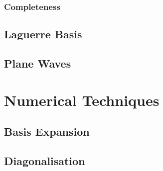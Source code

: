 \documentclass[draft]{article}
\begin{document}
\subsubsection{Completeness}
\label{app:laguerre-completeness}

\subsection{Laguerre Basis}
\label{app:laguerre-basis}

\subsection{Plane Waves}
\label{app:plane-waves}

\section{Numerical Techniques}
\label{app:numerical-techniques}

\subsection{Basis Expansion}
\label{app:basis-expansion}

\subsection{Diagonalisation}
\label{app:diagonalisation}
\end{document}

